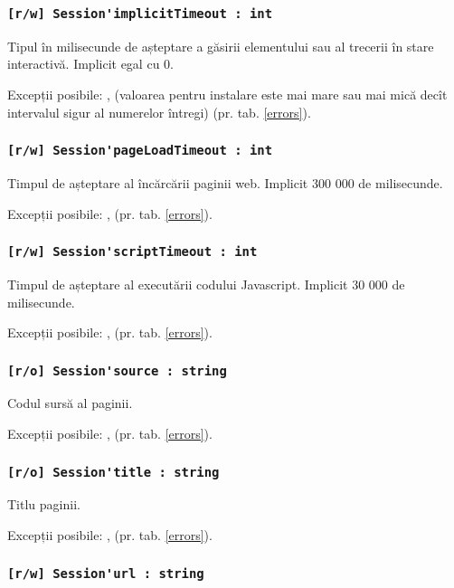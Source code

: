 \subsubsection{\lstinline|[r/w] Session'implicitTimeout : int|}

Tipul în milisecunde de așteptare a găsirii elementului sau al trecerii în stare interactivă. Implicit egal cu 0.

Excepții posibile: ,  (valoarea pentru instalare este mai mare sau mai mică decît intervalul sigur al numerelor întregi) (pr. tab. \ref{errors}).

\subsubsection{\lstinline|[r/w] Session'pageLoadTimeout : int|}

Timpul de așteptare al încărcării paginii web. Implicit 300 000 de milisecunde.

Excepții posibile: ,  (pr. tab. \ref{errors}).

\subsubsection{\lstinline|[r/w] Session'scriptTimeout : int|}

Timpul de așteptare al executării codului Javascript. Implicit 30 000 de milisecunde.

Excepții posibile: ,  (pr. tab. \ref{errors}).

\subsubsection{\lstinline|[r/o] Session'source : string|}

Codul sursă al paginii.

Excepții posibile: ,  (pr. tab. \ref{errors}).

\subsubsection{\lstinline|[r/o] Session'title : string|}

Titlu paginii.

Excepții posibile: ,  (pr. tab. \ref{errors}).

\subsubsection{\lstinline|[r/w] Session'url : string|}

